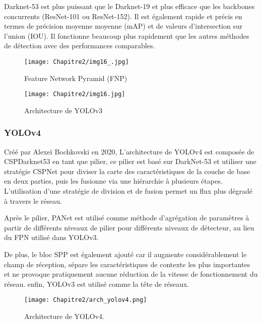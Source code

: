 Darknet-53  est plus puissant que le Darknet-19 et plus efficace que les backbones concurrents (ResNet-101 ou ResNet-152). Il est également rapide et précis en termes de précision moyenne moyenne (mAP) et de valeurs d'intersection sur l'union (IOU). Il fonctionne beaucoup plus rapidement que les autres méthodes de détection avec des performances comparables.

     \begin{figure}[H]
          \centering
          \texttt{[image: Chapitre2/img16\_.jpg]}
          \caption{Feature Network Pyramid (FNP)}
          \label{img16_}
          \end{figure}
     \begin{figure}[H]
          \centering
          \texttt{[image: Chapitre2/img16.jpg]}
          \caption{Architecture de YOLOv3}
          \label{img16}
          \end{figure}
     

\subsubsection{YOLOv4\cite{yolov4_paper} }

Créé par Alexeï Bochkovski en 2020, L'architecture de YOLOv4 est composée de CSPDarknet53 en tant que pilier, ce pilier est basé sur DarkNet-53 et utiliser une stratégie CSPNet\cite{cspnet} pour diviser la carte des caractéristiques de la couche de base en deux parties, puis les fusionne via une hiérarchie à plusieurs étapes. L'utilisation d'une stratégie de division et de fusion permet un flux plus dégradé à travers le réseau.

Après le pilier, PANet\cite{panet} est utilisé comme méthode d'agrégation de paramètres à partir de différents niveaux de pilier pour différents niveaux de détecteur, au lieu du FPN utilisé dans YOLOv3.

De plus, le bloc SPP\cite{spp} est également ajouté car il augmente considérablement le champ de réception, sépare les caractéristiques de contexte les plus importantes et ne provoque pratiquement aucune réduction de la vitesse de fonctionnement du réseau.
enfin, YOLOv3 est utilisé comme la tête de réseaux.
\begin{figure}[H]
          \centering
          \texttt{[image: Chapitre2/arch\_yolov4.png]}
          \caption{Architecture de YOLOv4.}
          \label{img16_}
          \end{figure}

